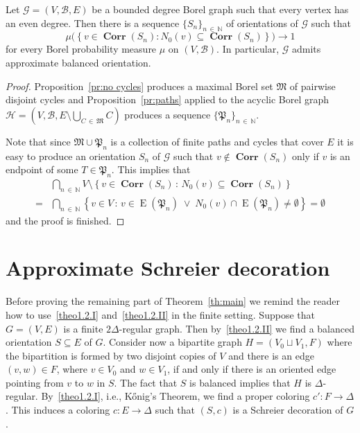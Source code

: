\documentclass[AHL,Unicode,longabstracts,published]{cedram}
\DeclareMathOperator{\Corr}{\mathbf{Corr}}
\DeclareMathOperator{\E}{\mathrm{E}}
\newcommand{\clG}{\mathcal{G}}
\newcommand{\clB}{\mathcal{B}}
\newcommand{\clH}{\mathcal{H}}
\newcommand{\bbZ}{\mathbb{N}}
\newcommand{\frkP}{\mathfrak{P}}
\newcommand{\frkM}{\mathfrak{M}}
\newcommand*{\MK}{\mkern 2mu}
\newcommand{\clG}{\mathcal{G}}
\begin{document}
\vspace{30pt}
\pagebreak

\begin{theo}[{Theorem~\ref{th:main}$\MK$\eqref{theo1.2.II}}]\label{th:orientation}
Let $\clG=(V,\clB,E)$ be a bounded degree Borel graph such that every vertex has an even degree. Then there is a sequence $\{S_n\}_{n\,\in\,\bbZ}$ of orientations of $\clG$ such that
\[
\mu\big(\left\{v\in \Corr(S_n):N_0(v)\subseteq \Corr(S_n)\right\}\big)\to 1
\]
for every Borel probability measure $\mu$ on $(V,\clB)$. In particular, $\clG$ admits approximate balanced orientation.
\end{theo}


\begin{proof}
Proposition~\ref{pr:no cycles} produces a maximal Borel set $\frkM$ of pairwise disjoint cycles and Proposition~\ref{pr:paths} applied to the acyclic Borel graph $\clH=(V,\clB,E\setminus \bigcup_{C\,\in\,\frkM} C)$ produces a sequence $\{\frkP_n\}_{n\,\in\,\bbZ}$.

Note that since $\frkM\cup \frkP_n$ is a collection of finite paths and cycles that cover $E$ it is easy to produce an orientation $S_n$ of $\clG$ such that $v\not\in \Corr(S_n)$ only if $v$ is an endpoint of some $T\in \frkP_n$. This implies that
\begin{align*}
& \bigcap_{n\,\in\,\bbZ}V\setminus \left\{v\in \Corr(S_n)\,:\,N_0(v)\subseteq \Corr(S_n)\right\} \\
= &  \bigcap_{n\,\in\,\bbZ} \left\{v\in V\,:\,v\in \E(\frkP_n) \; \vee \; N_0(v)\cap \E(\frkP_n) \not=\emptyset \right\}=\emptyset
\end{align*}
and the proof is finished.
\end{proof}



\section{Approximate Schreier decoration}

Before proving the remaining part of Theorem~\ref{th:main} we remind the reader how to use~\eqref{theo1.2.I} and~\eqref{theo1.2.II} in the finite setting. Suppose that $G=(V,E)$ is a finite $2\Delta$-regular graph. Then by~\eqref{theo1.2.II} we find a balanced orientation $S\subseteq E$ of $G$. Consider now a bipartite graph $H=(V_0\sqcup V_1,F)$ where the bipartition is formed by two disjoint copies of $V$ and there is an edge $(v,w)\in F$, where $v\in V_0$ and $w\in V_1$, if and only if there is an oriented edge pointing from $v$ to $w$ in $S$. The fact that $S$ is balanced implies that $H$ is $\Delta$-regular. By~\eqref{theo1.2.I}, i.e., Kőnig's Theorem, we find a proper coloring $c':F\to \Delta$. This induces a coloring $c:E\to \Delta$ such that $(S,c)$ is a Schreier decoration of $G$.
\end{document}
